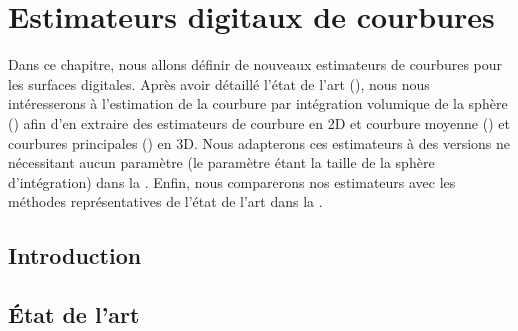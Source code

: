 %
\chapter{Estimateurs digitaux de courbures}
\label{sec:estimators}
%
%
\setcounter{minitocdepth}{4}
\minitoc
%
\newpage
%
Dans ce chapitre, nous allons définir de nouveaux estimateurs de courbures pour
les surfaces digitales. Après avoir détaillé l'état de l'art
(), nous nous intéresserons à l'estimation de la
courbure par intégration volumique de la sphère
() afin d'en extraire des estimateurs de
courbure en 2D et courbure moyenne () et
courbures principales () en 3D. Nous adapterons
ces estimateurs à des versions ne nécessitant aucun paramètre (le paramètre
étant la taille de la sphère d'intégration) dans la
. Enfin, nous comparerons nos
estimateurs avec les méthodes représentatives de l'état de l'art dans la
.
%
\section{Introduction}
\label{sec:estimators:introduction}
%
\section{État de l'art}%
\label{sec:estimators:SOTA}
%
